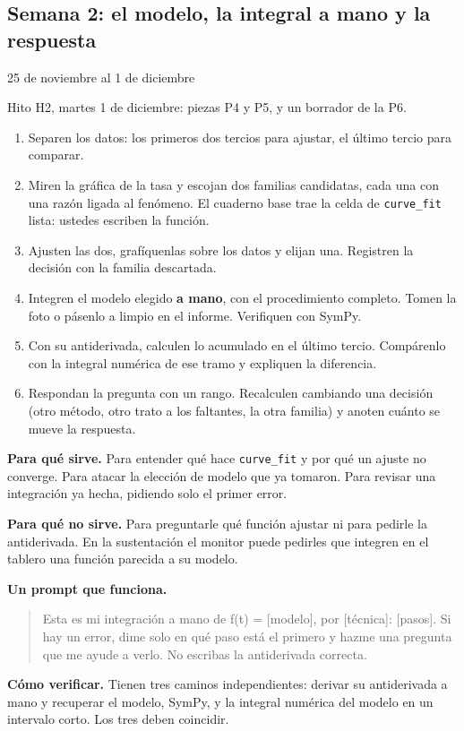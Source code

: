 \documentclass[12pt,letterpaper]{article}
\newcommand{\fechaHdos}{martes 1 de diciembre}
\newcommand{\prompt}[1]{\begin{quote}\small\ttfamily #1\end{quote}}
\begin{document}
\subsection{Semana 2: el modelo, la integral a mano y la respuesta}
{\large 25 de noviembre al 1 de diciembre}

\begin{cajameta}
Hito H2, \fechaHdos: piezas P4 y P5, y un borrador de la P6.
\end{cajameta}

\begin{enumerate}[label=\arabic*.,itemsep=0.2em]
    \item Separen los datos: los primeros dos tercios para ajustar, el último tercio para comparar.
    \item Miren la gráfica de la tasa y escojan dos familias candidatas, cada una con una razón ligada al fenómeno. El cuaderno base trae la celda de \texttt{curve\_fit} lista: ustedes escriben la función.
    \item Ajusten las dos, grafíquenlas sobre los datos y elijan una. Registren la decisión con la familia descartada.
    \item Integren el modelo elegido \textbf{a mano}, con el procedimiento completo. Tomen la foto o pásenlo a limpio en el informe. Verifiquen con SymPy.
    \item Con su antiderivada, calculen lo acumulado en el último tercio. Compárenlo con la integral numérica de ese tramo y expliquen la diferencia.
    \item Respondan la pregunta con un rango. Recalculen cambiando una decisión (otro método, otro trato a los faltantes, la otra familia) y anoten cuánto se mueve la respuesta.
\end{enumerate}

\begin{cajaia}
\textbf{Para qué sirve.} Para entender qué hace \texttt{curve\_fit} y por qué un ajuste no converge. Para atacar la elección de modelo que ya tomaron. Para revisar una integración ya hecha, pidiendo solo el primer error.

\textbf{Para qué no sirve.} Para preguntarle qué función ajustar ni para pedirle la antiderivada. En la sustentación el monitor puede pedirles que integren en el tablero una función parecida a su modelo.

\textbf{Un prompt que funciona.}
\prompt{Esta es mi integración a mano de f(t) = [modelo], por [técnica]: [pasos]. Si hay un error, dime solo en qué paso está el primero y hazme una pregunta que me ayude a verlo. No escribas la antiderivada correcta.}

\textbf{Cómo verificar.} Tienen tres caminos independientes: derivar su antiderivada a mano y recuperar el modelo, SymPy, y la integral numérica del modelo en un intervalo corto. Los tres deben coincidir.
\end{cajaia}
\end{document}

